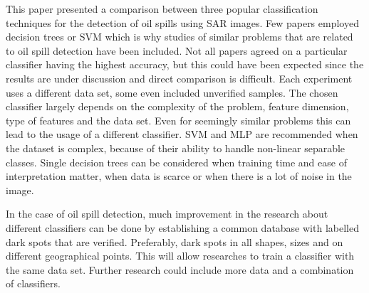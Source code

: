 This paper presented a comparison between three popular classification techniques for the detection of oil spills using SAR images. Few papers employed decision trees or SVM which is why studies of similar problems that are related to oil spill detection have been included. Not all papers agreed on a particular classifier having the highest accuracy, but this could have been expected since the results are under discussion and direct comparison is difficult. Each experiment uses a different data set, some even included unverified samples. The chosen classifier largely depends on the complexity of the problem, feature dimension, type of features and the data set. Even for seemingly similar problems this can lead to the usage of a different classifier. SVM and MLP are recommended when the dataset is complex, because of their ability to handle non-linear separable classes. Single decision trees can be considered when training time and ease of interpretation matter, when data is scarce or when there is a lot of noise in the image. 

In the case of oil spill detection, much improvement in the research about different classifiers can be done by establishing a common database with labelled dark spots that are verified. Preferably, dark spots in all shapes, sizes and on different geographical points. This will allow researches to train a classifier with the same data set. Further research could include more data and a combination of classifiers.


